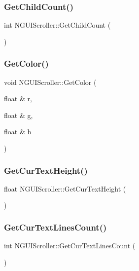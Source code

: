\subsubsection{\texorpdfstring{Get\+Child\+Count()}{GetChildCount()}}
{\footnotesize\ttfamily int N\+G\+U\+I\+Scroller\+::\+Get\+Child\+Count (\begin{DoxyParamCaption}{ }\end{DoxyParamCaption})}

\hypertarget{class_n_g_u_i_scroller_a2c3e6851f92ebea8edff2829772933c7}{}\label{class_n_g_u_i_scroller_a2c3e6851f92ebea8edff2829772933c7} 
\subsubsection{\texorpdfstring{Get\+Color()}{GetColor()}}
{\footnotesize\ttfamily void N\+G\+U\+I\+Scroller\+::\+Get\+Color (\begin{DoxyParamCaption}\item[{float \&}]{r,  }\item[{float \&}]{g,  }\item[{float \&}]{b }\end{DoxyParamCaption})}

\hypertarget{class_n_g_u_i_scroller_aed84cc5ea9bf4e336a9175fb3372549b}{}\label{class_n_g_u_i_scroller_aed84cc5ea9bf4e336a9175fb3372549b} 
\subsubsection{\texorpdfstring{Get\+Cur\+Text\+Height()}{GetCurTextHeight()}}
{\footnotesize\ttfamily float N\+G\+U\+I\+Scroller\+::\+Get\+Cur\+Text\+Height (\begin{DoxyParamCaption}{ }\end{DoxyParamCaption})}

\hypertarget{class_n_g_u_i_scroller_aeaf819af0c0d02221293677069ce616d}{}\label{class_n_g_u_i_scroller_aeaf819af0c0d02221293677069ce616d} 
\subsubsection{\texorpdfstring{Get\+Cur\+Text\+Lines\+Count()}{GetCurTextLinesCount()}}
{\footnotesize\ttfamily int N\+G\+U\+I\+Scroller\+::\+Get\+Cur\+Text\+Lines\+Count (\begin{DoxyParamCaption}{ }\end{DoxyParamCaption})}

